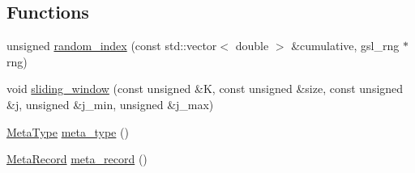 \subsection*{Functions}
\begin{DoxyCompactItemize}
\item 
unsigned \hyperlink{namespaceeos_1_1proposal__functions_a55ba4d78e5beeb12699c697874f7c1df}{random\_\-index} (const std::vector$<$ double $>$ \&cumulative, gsl\_\-rng $\ast$rng)
\item 
void \hyperlink{namespaceeos_1_1proposal__functions_a3714de403c64ba76dcdb901f138f48de}{sliding\_\-window} (const unsigned \&K, const unsigned \&size, const unsigned \&j, unsigned \&j\_\-min, unsigned \&j\_\-max)
\item 
\hyperlink{classeos_1_1hdf5_1_1Composite}{MetaType} \hyperlink{namespaceeos_1_1proposal__functions_ac169711c02c184c64ba3a406bd18598b}{meta\_\-type} ()
\item 
\hyperlink{namespaceeos_1_1proposal__functions_a7b9711fcd1f76e034c72073e2d5d7f15}{MetaRecord} \hyperlink{namespaceeos_1_1proposal__functions_aa2f7d6804a251f162c263056d0e660e0}{meta\_\-record} ()
\end{DoxyCompactItemize}


